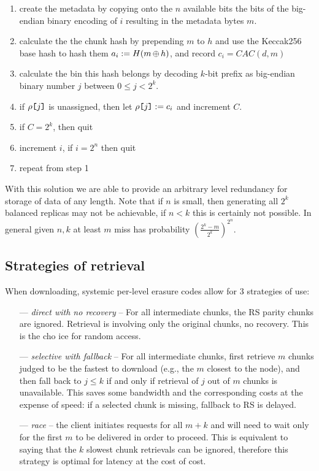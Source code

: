 \begin{enumerate}[noitemsep]
    \item create the metadata by copying onto the $n$ available bits the bits of the big-endian binary encoding of $i$ resulting in the metadata bytes $m$.
    \item calculate the the chunk hash by prepending      $m$ to $h$ and use the Keccak256 base hash to hash them $a_i:=H(m\operatorname{\operatorname{\oplus}} h)$, and record $c_i=\mathit{CAC}(d,m)$
    \item calculate the bin this hash belongs by decoding $k$-bit prefix as big-endian binary number $j$ between $0\leq j<2^k$.
    \item if $\rho\texttt{[}\/j\/\texttt{]}$ is unassigned, then let $\rho\texttt{[}\/j\/\texttt{]}:=c_i$ and increment $C$.
    \item if $C=2^k$, then quit
    \item increment $i$, if $i=2^n$ then quit
    \item repeat from step 1 
\end{enumerate}

With this solution we are able to provide an arbitrary level redundancy for storage of data of any length. Note that if $n$ is small, then generating all $2^k$ balanced replicas may not be achievable, if $n<k$ this is certainly not possible.
In general given $n, k$ at least $m$ miss has probability $\left(\frac{2^k-m}{2^k}\right)^{2^n}$.


\subsection{Strategies of retrieval}
\label{sec:strategies}

When downloading, systemic per-level erasure codes allow for 3 strategies of use:
\begin{itemize}[noitemsep]
      \item[---]
\emph{direct with no recovery}
– For all intermediate chunks, the RS parity chunks are ignored. Retrieval is involving  only the original chunks, no recovery. This is the cho ice for random access.
\item[---]
\emph{selective with fallback}
– For all intermediate chunks, first retrieve $ m$ chunks judged to be the fastest to download (e.g., the $m$ closest to the node), and then fall back to $j\leq k$ if and only if retrieval of $j$ out of $m$ chunks is unavailable. This saves
some bandwidth and the corresponding costs at the expense of speed: if a selected chunk
is missing, fallback to RS is delayed.
\item[---] \emph{race} – the client initiates requests for all $m+k$ and will need to wait only for the first $m$ to be delivered in order to proceed. This is equivalent to saying that the  $k$ slowest chunk retrievals can be ignored, therefore this strategy is optimal for latency at the cost of cost.
\end{itemize}


